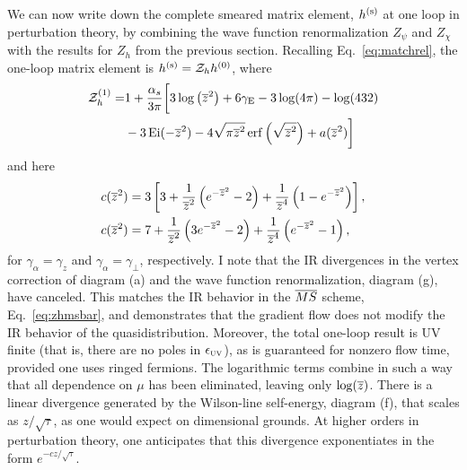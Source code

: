 We can now write down the complete smeared matrix element, $h^{(\mathrm{s})}$ at one loop in perturbation theory, by combining the wave function renormalization $Z_\psi$ and $Z_\chi$ \cite{Luscher:2013cpa,Makino:2014taa} with the results for $Z_h$ from the previous section. Recalling Eq.~\eqref{eq:matchrel}, the one-loop matrix element is
$h^{(\mathrm{s})} = {\cal Z}_hh^{(0)}$, where
\begin{align}
{\cal Z}_h^{(1)} = & {} 1 + \frac{\alpha_s}{3\pi}\bigg[3\log\left(\overline{z}^2\right) +6\gamma_{\mathrm{E}}-3\log(4\pi)-\log(432)\nonumber \\
{} &  -3\operatorname{Ei}(-\overline{z}^2) -4\sqrt{\pi\overline{z}^2}\operatorname{erf}\left(\sqrt{\overline{z}^2}\right)+a(\overline{z}^2)\bigg]
\end{align}
and here
\begin{align}
c(\overline{z}^2) = {} & 3\left[3+\frac{1}{\overline{z}^2}\left(e^{-\overline{z}^2}-2\right)+\frac{1}{\overline{z}^4}\left(1-e^{-\overline{z}^2}\right)\right] ,  \label{eq:cmuz}\\
c(\overline{z}^2) = {} & 7 +\frac{1}{\overline{z}^2}\left(3e^{-\overline{z}^2}-2\right) +\frac{1}{\overline{z}^4}\left(e^{-\overline{z}^2}- 1\right),\label{eq:cmuperp}
\end{align}
for $\gamma_\alpha = \gamma_z$ and $\gamma_\alpha = \gamma_\perp$, respectively. I note that the IR divergences in the vertex correction of diagram (a) and the wave function renormalization, diagram (g), have canceled. This matches the IR behavior in the $\overline{MS}$ scheme, Eq.~\eqref{eq:zhmsbar}, and demonstrates that the gradient flow does not modify the IR behavior of the quasidistribution. Moreover, the total one-loop result is UV finite (that is, there are no poles in $\epsilon_{\scriptscriptstyle\mathrm{UV}}$), as is guaranteed for nonzero flow time, provided one uses ringed fermions. The logarithmic terms combine in such a way that all dependence on $\mu$ has been eliminated, leaving only $\log(\overline{z})$. There is a linear divergence generated by the Wilson-line self-energy, diagram (f), that scales as $z/\sqrt{\tau}$, as one would expect on dimensional grounds. At higher orders in perturbation theory, one anticipates that this divergence exponentiates in the form $e^{-cz/\sqrt{\tau}}$.

